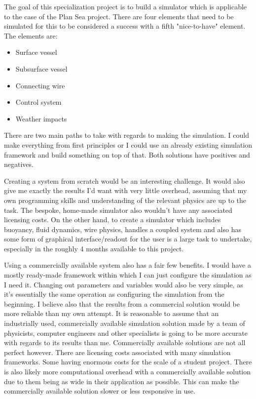 \label{sec:sim_options}
The goal of this specialization project is to build a simulator which is applicable to the case of the Plan Sea project. There are four elements that need to be simulated for this to be considered a success with a fifth "nice-to-have" element. The elements are:
\begin{itemize}
\item Surface vessel
\item Subsurface vessel
\item Connecting wire
\item Control system
\item Weather impacts
\end{itemize}

There are two main paths to take with regards to making the simulation. I could make everything from first principles or I could use an already existing simulation framework and build something on top of that. Both solutions have positives and negatives. 

Creating a system from scratch would be an interesting challenge. It would also give me exactly the results I'd want with very little overhead, assuming that my own programming skills and understanding of the relevant physics are up to the task. The bespoke, home-made simulator also wouldn't have any associated licensing costs. On the other hand, to create a simulator which includes buoyancy, fluid dynamics, wire physics, handles a coupled system and also has some form of graphical interface/readout for the user is a large task to undertake, especially in the roughly 4 months available to this project. 

Using a commercially available system also has a fair few benefits. I would have a mostly ready-made framework within which I can just configure the simulation as I need it. Changing out parameters and variables would also be very simple, as it's essentially the same operation as configuring the simulation from the beginning. I believe also that the results from a commercial solution would be more reliable than my own attempt. It is reasonable to assume that an industrially used, commercially available simulation solution made by a team of physicists, computer engineers and other specialists is going to be more accurate with regards to its results than me. Commercially available solutions are not all perfect however. There are licensing costs associated with many simulation frameworks. Some having enormous costs for the scale of a student project. There is also likely more computational overhead with a commercially available solution due to them being as wide in their application as possible. This can make the commercially available solution slower or less responsive in use. 


